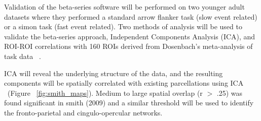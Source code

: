 \documentclass[phd,appendix,figures]{uithesis}
\begin{document}
Validation of the beta-series software will be performed on two younger adult datasets where they performed a standard arrow flanker task (slow event related) or a simon task (fast event related).
Two methods of analysis will be used to validate the beta-series approach, Independent Components Analysis (ICA), and ROI-ROI correlations with 160 ROIs derived from Dosenbach's meta-analysis of task data ~\citep{Dosenbach2010}.

ICA will reveal the underlying structure of the data, and the resulting components will be spatially correlated with existing parcellations using ICA ~\citep{Smith2009}(Figure ~\ref{fig:smith_maps}).
Medium to large spatial overlap (r $>$ .25) was found significant in smith (2009) and a similar threshold will be used to identify the fronto-parietal and cingulo-opercular networks.
\end{document}
